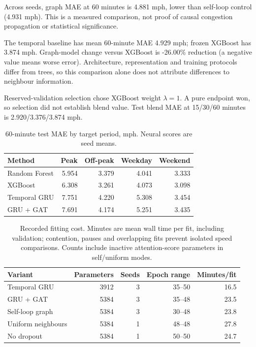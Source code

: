 Across seeds, graph MAE at 60 minutes is 4.881 mph, lower than self-loop control (4.931 mph). This is a measured comparison, not proof of causal congestion propagation or statistical significance.


The temporal baseline has mean 60-minute MAE 4.929 mph; frozen XGBoost has 3.874 mph. Graph-model change versus XGBoost is -26.00\% reduction (a negative value means worse error). Architecture, representation and training protocols differ from trees, so this comparison alone does not attribute differences to neighbour information.


Reserved-validation selection chose XGBoost weight $\lambda=1$. A pure endpoint won, so selection did not establish blend value. Test blend MAE at 15/30/60 minutes is 2.920/3.376/3.874 mph.


\begin{table}[t]\centering\small
\caption{60-minute test MAE by target period, mph. Neural scores are seed means.}
\begin{tabular}{lrrrr}\toprule
Method & Peak & Off-peak & Weekday & Weekend\\\midrule
Random Forest & 5.954 & 3.379 & 4.041 & 3.333\\
XGBoost & 6.308 & 3.261 & 4.073 & 3.098\\
Temporal GRU & 7.751 & 4.220 & 5.308 & 3.454\\
GRU + GAT & 7.691 & 4.174 & 5.251 & 3.435\\
\bottomrule\end{tabular}
\end{table}

\begin{table}[t]\centering\small
\caption{Recorded fitting cost. Minutes are mean wall time per fit, including validation; contention, pauses and overlapping fits prevent isolated speed comparisons. Counts include inactive attention-score parameters in self/uniform modes.}
\begin{tabular}{lrrrr}\toprule
Variant & Parameters & Seeds & Epoch range & Minutes/fit\\\midrule
Temporal GRU & 3912 & 3 & 35--50 & 16.5\\
GRU + GAT & 5384 & 3 & 35--48 & 23.5\\
Self-loop graph & 5384 & 3 & 30--48 & 23.8\\
Uniform neighbours & 5384 & 1 & 48--48 & 27.8\\
No dropout & 5384 & 1 & 50--50 & 24.7\\
\bottomrule\end{tabular}
\end{table}

